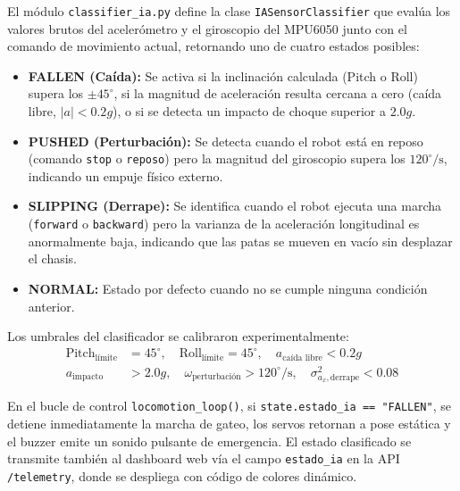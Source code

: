 \documentclass[12pt]{article}
\newcommand{\codigo}[1]{\texttt{#1}}
\begin{document}
El módulo \codigo{classifier\_ia.py} define la clase \codigo{IASensorClassifier} que evalúa los valores brutos del acelerómetro y el giroscopio del MPU6050 junto con el comando de movimiento actual, retornando uno de cuatro estados posibles:

\begin{itemize}
    \item \textbf{FALLEN (Caída):} Se activa si la inclinación calculada (Pitch o Roll) supera los $\pm 45^\circ$, si la magnitud de aceleración resulta cercana a cero (caída libre, $|a| < 0.2g$), o si se detecta un impacto de choque superior a $2.0g$.
    \item \textbf{PUSHED (Perturbación):} Se detecta cuando el robot está en reposo (comando \texttt{stop} o \texttt{reposo}) pero la magnitud del giroscopio supera los $120^\circ/\text{s}$, indicando un empuje físico externo.
    \item \textbf{SLIPPING (Derrape):} Se identifica cuando el robot ejecuta una marcha (\texttt{forward} o \texttt{backward}) pero la varianza de la aceleración longitudinal es anormalmente baja, indicando que las patas se mueven en vacío sin desplazar el chasis.
    \item \textbf{NORMAL:} Estado por defecto cuando no se cumple ninguna condición anterior.
\end{itemize}

Los umbrales del clasificador se calibraron experimentalmente:
\begin{align*}
    \text{Pitch}_{\text{límite}} &= 45^\circ, \quad
    \text{Roll}_{\text{límite}} = 45^\circ, \quad
    a_{\text{caída libre}} < 0.2g \\
    a_{\text{impacto}} &> 2.0g, \quad
    \omega_{\text{perturbación}} > 120^\circ/\text{s}, \quad
    \sigma^2_{a_x, \text{derrape}} < 0.08
\end{align*}

En el bucle de control \codigo{locomotion\_loop()}, si \codigo{state.estado\_ia == "FALLEN"}, se detiene inmediatamente la marcha de gateo, los servos retornan a pose estática y el buzzer emite un sonido pulsante de emergencia. El estado clasificado se transmite también al dashboard web vía el campo \codigo{estado\_ia} en la API \texttt{/telemetry}, donde se despliega con código de colores dinámico.

\newpage

\end{document}
